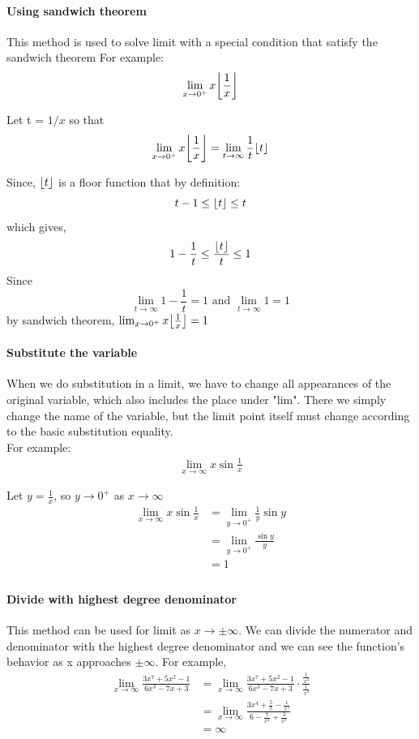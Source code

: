 \documentclass[12pt]{article}
\DeclarePairedDelimiter\floor{\lfloor}{\rfloor}
\begin{document}
\paragraph{Using sandwich theorem} This method is used to solve limit with a special condition that satisfy the sandwich theorem
For example:
\begin{align*} 
    \lim_{x \to 0^{+}} x \floor*{\frac{1}{x}}
\end{align*}

\noindent
Let t = $1/x$ so that
\[
    \lim_{x \to 0^{+}} x \floor*{\frac{1}{x}} = \lim_{t \to \infty} \frac{1}{t} \floor*{t} 
\]

\noindent
Since, $\floor*{t}$ is a floor function that by definition:
\[
    t - 1 \leq \floor*{t} \leq t
\]
which gives,
\[
    1 - \frac{1}{t} \leq \frac{\floor*{t}}{t}  \leq 1
\]
\noindent
Since
\[
    \lim_{t \to \infty} 1 - \frac{1}{t} = 1 \textrm{ and } \lim_{t \to \infty} 1 = 1
\]
by sandwich theorem, $\lim_{x \to 0^{+}} x \floor*{\frac{1}{x}} = 1$
\paragraph{Substitute the variable} When we do substitution in a limit, we have to change all appearances of the original 
variable, which also includes the place under "lim". There we simply change the name of the variable, but the limit point 
itself must change according to the basic substitution equality. \\
For example:
\begin{align*} 
    \lim_{x \to \infty} x \sin{\frac{1}{x}}
\end{align*}

\noindent
Let $y = \frac{1}{x}$, so $y \to 0^{+}$ as $x \to \infty$
\begin{align*} 
    \lim_{x \to \infty} x \sin{\frac{1}{x}} & = \lim_{y \to 0^{+}} \frac{1}{y} \sin{y} \\
    & = \lim_{y \to 0^{+}} \frac{\sin{y}}{y} \\
    & = 1 \\
\end{align*}

\paragraph{Divide with highest degree denominator} This method can be used for limit as $x \to \pm \infty$. We can 
divide the numerator and denominator with the highest degree denominator and we can see the function's behavior as 
x approaches $\pm \infty$. For example,
\begin{align*} 
    \lim_{x \to \infty}\frac{3x^7 + 5x^2 - 1}{6x^3 - 7x + 3} &= \lim_{x \to \infty}\frac{3x^7 + 5x^2 - 1}{6x^3 - 7x + 3} \cdot \frac{\frac{1}{x^3}}{\frac{1}{x^3}} \\
    &= \lim_{x \to \infty}\frac{3x^4 + \frac{5}{x} - \frac{1}{x^3}}{6 - \frac{7}{x^2} + \frac{3}{x^3}} \\
    &= \infty
\end{align*}
\end{document}
